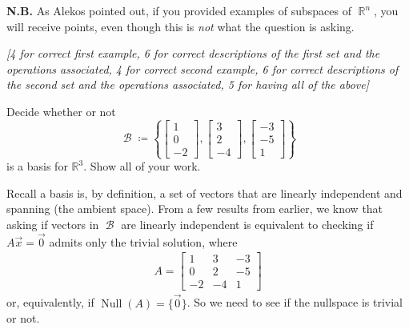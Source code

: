 \documentclass[answers,11pt]{exam}
\theoremstyle{definition}
\DeclareMathOperator{\R}{\mathbb{R}}
\DeclareMathOperator{\1}{\mathbbm{1}}
\DeclareMathOperator{\BB}{\mathcal{B}}
\DeclareMathOperator{\nul}{Null}
\begin{document}
\begin{questions}
\begin{solution}
	\textbf{N.B.} As Alekos pointed out, if you provided examples of subspaces of $\R^n$, you will receive points, even though this is \textit{not} what the question is asking.
	
	\textit{[4 for correct first example, 6 for correct descriptions of the first set and the operations associated, 4 for correct second example, 6 for correct descriptions of the second set and the operations associated, 5 for having all of the above]}
\end{solution}


\question[25] Decide whether or not 
\begin{equation*}
\BB \coloneqq \left\{
\begin{bmatrix}
1\\
0\\
-2
\end{bmatrix}, 
\begin{bmatrix}
3\\
2\\
-4
\end{bmatrix}, 
\begin{bmatrix}
-3\\
-5\\
1
\end{bmatrix}
\right\}
\end{equation*}
is a basis for $\mathbb{R}^3$. Show all of your work.
\addpoints

\begin{solution}
	Recall a basis is, by definition, a set of vectors that are linearly independent and spanning (the ambient space). From a few results from earlier, we know that asking if vectors in $\BB$ are linearly independent is equivalent to checking if $A\vec{x} = \vec{0}$ admits only the trivial solution, where 
	\begin{align*}
	A = \begin{bmatrix}
	1& 3 & -3\\
	0& 2 & -5 \\
	-2 & -4 &1
	\end{bmatrix}
	\end{align*}
	or, equivalently, if $\nul(A) = \{ \vec{0} \}$. So we need to see if the nullspace is trivial or not.
	

\end{solution}
\end{questions}
\end{document}
